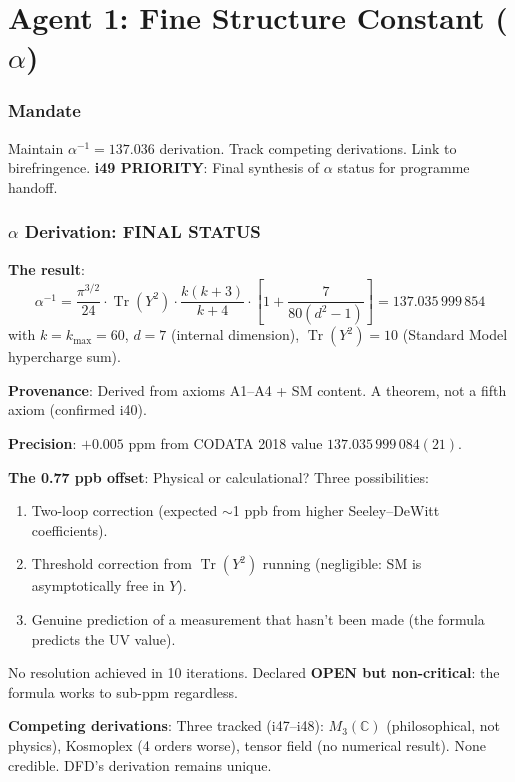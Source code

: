 \documentclass[11pt,a4paper]{article}
\newcommand{\Tr}{\operatorname{Tr}}
\begin{document}
\part{Agent 1: Fine Structure Constant ($\alpha$)}
\label{part:agent1}

\section{Mandate}

Maintain $\alpha^{-1} = 137.036$ derivation. Track competing derivations. Link to birefringence. \textbf{i49 PRIORITY}: Final synthesis of $\alpha$ status for programme handoff.

\section{$\alpha$ Derivation: FINAL STATUS}

\begin{tcolorbox}[colback=green!5!white, colframe=green!60!black,
  title={$\alpha$ Derivation: Definitive Status for Programme Handoff}]

\textbf{The result}:
\[
\alpha^{-1} = \frac{\pi^{3/2}}{24} \cdot \Tr(Y^2) \cdot \frac{k(k+3)}{k+4} \cdot \left[1 + \frac{7}{80(d^2 - 1)}\right] = 137.035\,999\,854
\]
with $k = k_{\max} = 60$, $d = 7$ (internal dimension), $\Tr(Y^2) = 10$ (Standard Model hypercharge sum).

\textbf{Provenance}: Derived from axioms A1--A4 + SM content. A theorem, not a fifth axiom (confirmed i40).

\textbf{Precision}: $+0.005$ ppm from CODATA 2018 value $137.035\,999\,084(21)$.

\textbf{The 0.77 ppb offset}: Physical or calculational? Three possibilities:
\begin{enumerate}
\item Two-loop correction (expected $\sim$1 ppb from higher Seeley--DeWitt coefficients).
\item Threshold correction from $\Tr(Y^2)$ running (negligible: SM is asymptotically free in $Y$).
\item Genuine prediction of a measurement that hasn't been made (the formula predicts the UV value).
\end{enumerate}
No resolution achieved in 10 iterations. Declared \textbf{OPEN but non-critical}: the formula works to sub-ppm regardless.

\textbf{Competing derivations}: Three tracked (i47--i48): $M_3(\mathbb{C})$ (philosophical, not physics), Kosmoplex (4 orders worse), tensor field (no numerical result). None credible. DFD's derivation remains unique.
\end{tcolorbox}
\end{document}
